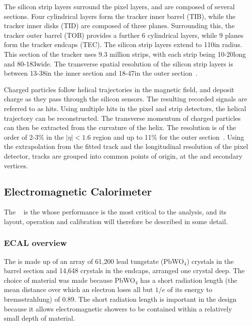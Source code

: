 The silicon strip layers surround the pixel layers, and are composed of several sections. Four cylindrical layers form the tracker inner barrel (TIB), while the tracker inner disks (TID) are composed of three planes. Surrounding this, the tracker outer barrel (TOB) provides a further 6 cylindrical layers, while 9 planes form the tracker endcaps (TEC). The silicon strip layers extend to 110\cm in radius. This section of the tracker uses 9.3 million strips, with each strip being 10-20\cm long and 80-183\um wide. The transverse spatial resolution of the silicon strip layers is between 13-38\um in the inner section and 18-47\um in the outer section~\cite{trackerperformance2014}.

Charged particles follow helical trajectories in the \CMS magnetic field, and deposit charge as they pass through the silicon sensors. The resulting recorded signals are referred to as hits. Using multiple hits in the pixel and strip detectors, the helical trajectory can be reconstructed. The transverse momentum \pT of charged particles can then be extracted from the curvature of the helix. The \pT resolution is of the order of 2-3\% in the $|\eta|<1.6$ region and up to 11\% for the outer section~\cite{trackerperformance2014}. Using the extrapolation from the fitted track and the longitudinal resolution of the pixel detector, tracks are grouped into common points of origin, at the \PV and secondary vertices. 

\subsection{Electromagnetic Calorimeter}
\label{sec:cms:ecal}

The \ECAL~\cite{CMSTDR,CMSEcalTDR} is the \subdetector whose performance is the most critical to the \Hgg analysis, and its layout, operation and calibration will therefore be described in some detail. 

\subsubsection{ECAL overview}
\label{sec:cms:ecal:overview}

The \ECAL is made up of an array of 61,200 lead tungstate (PbWO$_4$) crystals in the barrel section and 14,648 crystals in the endcaps, arranged one crystal deep. The choice of material was made because PbWO$_4$ has a short radiation length (the mean distance over which an electron loses all but $1/e$ of its energy to bremsstrahlung) of 0.89\cm. The short radiation length is important in the \ECAL design because it allows electromagnetic showers to be contained within a relatively small depth of material. 

